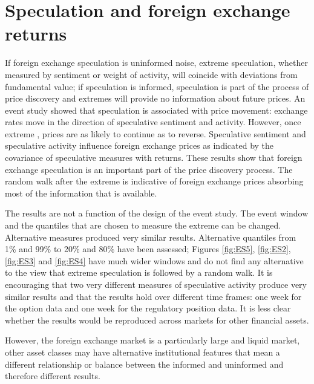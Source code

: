 \documentclass[ijfs,article,submit,oneauthor,pdftex,10pt,a4paper]{mdpi}
\begin{document}
\section{Speculation and foreign exchange returns}
If foreign exchange speculation is uninformed noise, extreme speculation, whether measured by sentiment or weight of activity, will coincide with deviations from fundamental value; if speculation is informed, speculation is part of the process of price discovery and extremes will provide no information about future prices. An event study showed that speculation is associated with price movement: exchange rates move in the direction of speculative sentiment and activity.  However, once extreme , prices are as likely to continue as to reverse. Speculative sentiment and speculative activity influence foreign exchange prices as indicated by the covariance of speculative measures with returns.  These results show that foreign exchange speculation is an important part of the price discovery process.  The random walk after the extreme is indicative of foreign exchange prices absorbing most of the information that is available.  
  
The results are not a function of the design of the event study.  The event window and the quantiles that are chosen to measure the extreme can be changed.  Alternative measures produced very similar results. Alternative quantiles from 1\% and 99\% to 20\% and 80\% have been assessed; Figures \ref{fig:ES5}, \ref{fig:ES2}, \ref{fig:ES3} and \ref{fig:ES4} have much wider windows and do not find any alternative to the view that extreme speculation is followed by a random walk.  
It is encouraging that two very different measures of speculative activity produce very similar results and that the results hold over different time frames: one week for the option data and one week for the regulatory position data.  It is less clear whether the results would be reproduced across markets for other financial assets.

   However, the foreign exchange market is a particularly large and liquid market, other asset classes may have alternative institutional features that mean a different relationship or balance between the informed and uninformed and therefore different results.  
\end{document}
